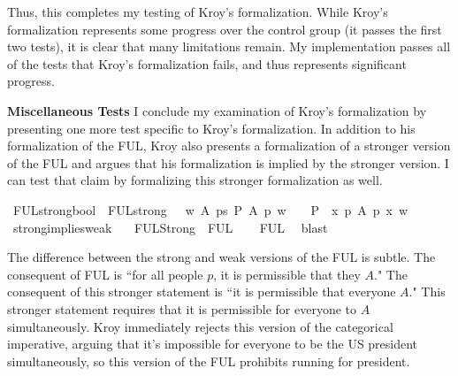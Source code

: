 \begin{isabellebody}
\begin{isamarkuptext}
Thus, this completes my testing of Kroy's formalization. While Kroy's formalization represents
some progress over the control group (it passes the first two tests), it is clear that many limitations
remain. My implementation passes all of the tests that Kroy's formalization fails, and thus represents
significant progress.%
\end{isamarkuptext}\isamarkuptrue%
%
\begin{isamarkuptext}%
\noindent \textbf{Miscellaneous Tests} I conclude my examination of Kroy's formalization by presenting
one more test specific to Kroy's formalization. In addition to his formalization of the FUL, Kroy also
presents a formalization of a stronger version of the FUL and argues that his formalization is implied
by the stronger version. I can test that claim by formalizing this stronger formalization as well.%
\end{isamarkuptext}\isamarkuptrue%
\isamarkupfalse%
\ FUL{\isacharunderscore}strong{\isacharcolon}{\isacharcolon}bool\ \ {\isachardoublequoteopen}FUL{\isacharunderscore}strong\ {\isasymequiv}\ \ {\isasymforall}w\ A{\isachardot}\ {\isacharparenleft}{\isacharparenleft}{\isasymexists}p{\isacharcolon}{\isacharcolon}s{\isachardot}\ {\isacharparenleft}{\isacharparenleft}P\ {\isacharbraceleft}A\ p{\isacharbraceright}{\isacharparenright}\ w{\isacharparenright}{\isacharparenright}\ \ {\isasymlongrightarrow}{\isacharparenleft}\ {\isacharparenleft}{\isacharparenleft}\ P\ {\isacharbraceleft}\ {\isasymlambda}x{\isachardot}\ {\isasymforall}p{\isachardot}\ A\ p\ x{\isacharbraceright}{\isacharparenright}\ w{\isacharparenright}{\isacharparenright}{\isacharparenright}{\isachardoublequoteclose}\isanewline
\isanewline
{}\isamarkupfalse%
\ strong{\isacharunderscore}implies{\isacharunderscore}weak{\isacharcolon}\isanewline
\ \ \ {\isachardoublequoteopen}FUL{\isacharunderscore}Strong\ {\isasymlongrightarrow}\ FUL{\isachardoublequoteclose}\isanewline
%
\isadelimproof
\ \ %
\endisadelimproof
%
\isatagproof
{}\isamarkupfalse%
\ FUL\ \isamarkupfalse%
\ blast\isanewline
%
%
\endisatagproof
{\isafoldproof}%
%
\isadelimproof
%
\endisadelimproof
%
\begin{isamarkuptext}%
The difference between the strong and weak versions of the FUL is subtle. The consequent of FUL is ``for all people $p$,
it is permissible that they $A$." The consequent of this stronger statement is ``it is permissible that 
everyone $A$." This stronger statement requires that it is permissible for everyone to
$A$ simultaneously. Kroy immediately rejects this version of the categorical imperative, arguing that 
it's impossible for everyone to be the US president simultaneously, so this version of the FUL prohibits
running for president.


\end{isamarkuptext}
\end{isabellebody}
